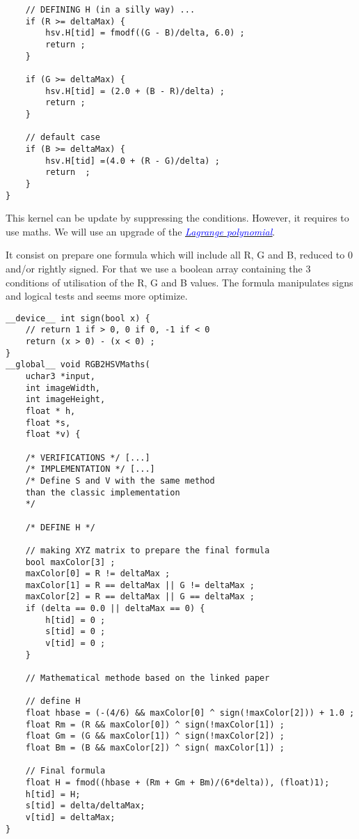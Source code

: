 \documentclass{article}
\begin{document}
\begin{enumerate}
\begin{verbatim}
    // DEFINING H (in a silly way) ...
    if (R >= deltaMax) {
        hsv.H[tid] = fmodf((G - B)/delta, 6.0) ; 
        return ;
    }

    if (G >= deltaMax) {
        hsv.H[tid] = (2.0 + (B - R)/delta) ;
        return ;
    }

    // default case 
    if (B >= deltaMax) {
        hsv.H[tid] =(4.0 + (R - G)/delta) ;
        return  ;
    }
}
    \end{verbatim}
    
    This kernel can be update by suppressing the conditions. However, it requires to use maths. We will use an upgrade of the \hyperlink{http://www.daaam.info/Downloads/Pdfs/proceedings/proceedings_2011/1591_Kobalicek.pdf}{\underline{\textit{\textcolor{blue}{Lagrange polynomial}}}}.
    
    It consist on prepare one formula which will include all R, G and B, reduced to 0 and/or rightly signed. For that we use a boolean array containing the 3 conditions of utilisation of the R, G and B values. The formula manipulates signs and logical tests and seems more optimize.  
    
    \begin{verbatim}
__device__ int sign(bool x) {
	// return 1 if > 0, 0 if 0, -1 if < 0
	return (x > 0) - (x < 0) ;
}
__global__ void RGB2HSVMaths(
    uchar3 *input, 
    int imageWidth, 
    int imageHeight, 
    float * h, 
    float *s, 
    float *v) {
    
    /* VERIFICATIONS */	[...]
    /* IMPLEMENTATION */ [...]
    /* Define S and V with the same method 
    than the classic implementation
    */
    
    /* DEFINE H */
    
    // making XYZ matrix to prepare the final formula 
    bool maxColor[3] ; 
    maxColor[0] = R != deltaMax ;
    maxColor[1] = R == deltaMax || G != deltaMax ;
    maxColor[2] = R == deltaMax || G == deltaMax ;
    if (delta == 0.0 || deltaMax == 0) {
    	h[tid] = 0 ;
    	s[tid] = 0 ;		
    	v[tid] = 0 ;
    }
    
    // Mathematical methode based on the linked paper
    
    // define H 
    float hbase = (-(4/6) && maxColor[0] ^ sign(!maxColor[2])) + 1.0 ;
    float Rm = (R && maxColor[0]) ^ sign(!maxColor[1]) ;
    float Gm = (G && maxColor[1]) ^ sign(!maxColor[2]) ;
    float Bm = (B && maxColor[2]) ^ sign( maxColor[1]) ;
    
    // Final formula 
    float H = fmod((hbase + (Rm + Gm + Bm)/(6*delta)), (float)1);
    h[tid] = H;
    s[tid] = delta/deltaMax;
    v[tid] = deltaMax;
}
    \end{verbatim}
    

\end{enumerate}
\end{document}
